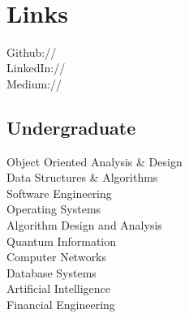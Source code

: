\documentclass[]{deedy-resume-openfont}
\begin{document}
\begin{minipage}[t]{0.30\textwidth}
 \\

\sectionsep


\section{Links} 
Github:// \href{https://github.com/anshulahuja98}{} \\
LinkedIn://  \href{https://www.linkedin.com/in/anshul-ahuja}{} \\
Medium://  \href{https://medium.com/@anshul.ahu/}{} \\
\href{https://scholar.google.com/citations?hl=en&user=jPd1-ygAAAAJ}{}

\sectionsep


\subsection{Undergraduate}
Object Oriented Analysis \& Design  \\
Data Structures \& Algorithms  \\
Software Engineering  \\
Operating Systems \\
Algorithm Design and Analysis \\
Quantum Information \\
Computer Networks \\
Database Systems \\
Artificial Intelligence \\
Financial Engineering \\


\end{minipage}
\end{document}
